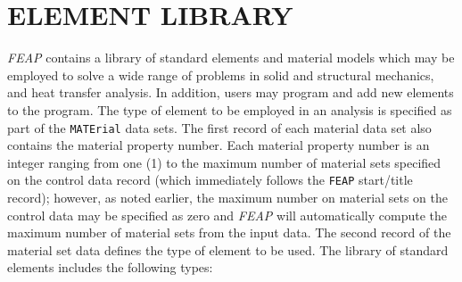 \chapter[Element Library]{ELEMENT LIBRARY}
\label{elmlib}

{\sl FEAP} contains a library of standard elements and material models which may
be employed to solve a wide range of problems in solid and structural mechanics,
and heat transfer analysis.
In addition, users may program and add new elements to the program.
The type of element to
be employed in an analysis is specified as part of the \texttt{MATErial} data
sets.  The first record of each material data set also contains the material
property number.  Each material property number is an integer ranging from
one (1) to the maximum number of material sets specified on the control data
record (which immediately follows the \texttt{FEAP} start/title record); however,
as noted earlier,
the maximum number on material sets on the control data may be specified
as zero and {\sl FEAP} will
automatically compute the maximum number of material sets from the input data.
The second record of the material set data defines the type of element to be
used.  The library of standard elements includes the following types:

